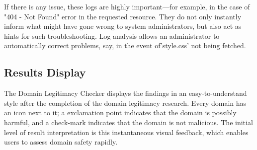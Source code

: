 If there is any issue, these logs are highly important—for example, in the case of "404 - Not Found" error in the requested resource. They do not only instantly inform what might have gone wrong to system administrators, but also act as hints for such troubleshooting. Log analysis allows an administrator to automatically correct problems, say, in the event of'style.css' not being fetched.

\subsection{Results Display}

The Domain Legitimacy Checker displays the findings in an easy-to-understand style after the completion of the domain legitimacy research. Every domain has an icon next to it; a  exclamation point indicates that the domain is possibly harmful, and a  check-mark indicates that the domain is not malicious. The initial level of result interpretation is this instantaneous visual feedback, which enables users to assess domain safety rapidly.

